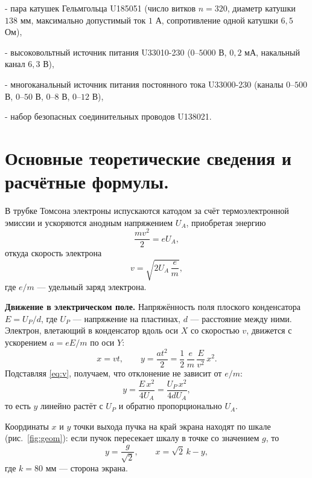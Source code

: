\documentclass[12pt, a4paper]{article}
\begin{document}
	- пара катушек Гельмгольца U185051 (число витков $n = 320$, диаметр катушки $138$ мм, максимально допустимый ток $1$ А, сопротивление одной катушки $6{,}5$ Ом),
	
	- высоковольтный источник питания U33010-230 ($0$--$5000$ В, $0{,}2$ мА, накальный канал $6{,}3$ В),
	
	- многоканальный источник питания постоянного тока U33000-230 (каналы $0$--$500$ В, $0$--$50$ В, $0$--$8$ В, $0$--$12$ В),
	
	- набор безопасных соединительных проводов U138021.
	
	\section{Основные теоретические сведения и расчётные формулы.}
	
	В трубке Томсона электроны испускаются катодом за счёт термоэлектронной эмиссии и ускоряются анодным напряжением $U_A$, приобретая энергию
	\begin{equation}
		\frac{mv^2}{2} = eU_A,
		\label{eq:energy}
	\end{equation}
	откуда скорость электрона
	\begin{equation}
		v = \sqrt{2U_A\,\frac{e}{m}},
		\label{eq:v}
	\end{equation}
	где $e/m$ --- удельный заряд электрона.
	
	\textbf{Движение в электрическом поле.} Напряжённость поля плоского конденсатора $E = U_P/d$, где $U_P$ --- напряжение на пластинах, $d$ --- расстояние между ними. Электрон, влетающий в конденсатор вдоль оси $X$ со скоростью $v$, движется с ускорением $a = eE/m$ по оси $Y$:
	\begin{equation}
		x = vt, \qquad y = \frac{at^2}{2} = \frac{1}{2}\,\frac{e}{m}\,\frac{E}{v^2}\,x^2.
		\label{eq:y}
	\end{equation}
	Подставляя \eqref{eq:v}, получаем, что отклонение не зависит от $e/m$:
	\begin{equation}
		y = \frac{E\,x^2}{4U_A} = \frac{U_P\,x^2}{4dU_A},
		\label{eq:ytheor}
	\end{equation}
	то есть $y$ линейно растёт с $U_P$ и обратно пропорционально $U_A$.
	
	Координаты $x$ и $y$ точки выхода пучка на край экрана находят по шкале (рис.~\ref{fig:geom}): если пучок пересекает шкалу в точке со значением $g$, то
	\begin{equation}
		y = \frac{g}{\sqrt{2}}, \qquad x = \sqrt{2}\,k - y,
		\label{eq:xy}
	\end{equation}
	где $k = 80$ мм --- сторона экрана.
	
\end{document}
